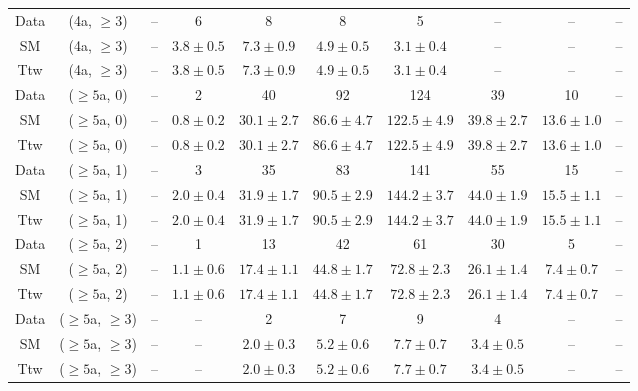 \begin{table}[h!]
{\begin{tabular}{cccccccccc}
	Data & (4a, $\ge3$) & -- & 6 & 8 & 8 & 5 & -- & -- & -- \\[0.5ex] 
	SM & (4a, $\ge3$) & -- & $3.8\pm 0.5$ & $7.3\pm 0.9$ & $4.9\pm 0.5$ & $3.1\pm 0.4$ & -- & -- & -- \\[0.5ex] 
	Ttw & (4a, $\ge3$) & -- & $3.8\pm 0.5$ & $7.3\pm 0.9$ & $4.9\pm 0.5$ & $3.1\pm 0.4$ & -- & -- & -- \\[0.5ex] 
	Data & ($\ge5$a, 0) & -- & 2 & 40 & 92 & 124 & 39 & 10 & -- \\[0.5ex] 
	SM & ($\ge5$a, 0) & -- & $0.8\pm 0.2$ & $30.1\pm 2.7$ & $86.6\pm 4.7$ & $122.5\pm 4.9$ & $39.8\pm 2.7$ & $13.6\pm 1.0$ & -- \\[0.5ex] 
	Ttw & ($\ge5$a, 0) & -- & $0.8\pm 0.2$ & $30.1\pm 2.7$ & $86.6\pm 4.7$ & $122.5\pm 4.9$ & $39.8\pm 2.7$ & $13.6\pm 1.0$ & -- \\[0.5ex] 
	Data & ($\ge5$a, 1) & -- & 3 & 35 & 83 & 141 & 55 & 15 & -- \\[0.5ex] 
	SM & ($\ge5$a, 1) & -- & $2.0\pm 0.4$ & $31.9\pm 1.7$ & $90.5\pm 2.9$ & $144.2\pm 3.7$ & $44.0\pm 1.9$ & $15.5\pm 1.1$ & -- \\[0.5ex] 
	Ttw & ($\ge5$a, 1) & -- & $2.0\pm 0.4$ & $31.9\pm 1.7$ & $90.5\pm 2.9$ & $144.2\pm 3.7$ & $44.0\pm 1.9$ & $15.5\pm 1.1$ & -- \\[0.5ex] 
	Data & ($\ge5$a, 2) & -- & 1 & 13 & 42 & 61 & 30 & 5 & -- \\[0.5ex] 
	SM & ($\ge5$a, 2) & -- & $1.1\pm 0.6$ & $17.4\pm 1.1$ & $44.8\pm 1.7$ & $72.8\pm 2.3$ & $26.1\pm 1.4$ & $7.4\pm 0.7$ & -- \\[0.5ex] 
	Ttw & ($\ge5$a, 2) & -- & $1.1\pm 0.6$ & $17.4\pm 1.1$ & $44.8\pm 1.7$ & $72.8\pm 2.3$ & $26.1\pm 1.4$ & $7.4\pm 0.7$ & -- \\[0.5ex] 
	Data & ($\ge5$a, $\ge3$) & -- & -- & 2 & 7 & 9 & 4 & -- & -- \\[0.5ex] 
	SM & ($\ge5$a, $\ge3$) & -- & -- & $2.0\pm 0.3$ & $5.2\pm 0.6$ & $7.7\pm 0.7$ & $3.4\pm 0.5$ & -- & -- \\[0.5ex] 
	Ttw & ($\ge5$a, $\ge3$) & -- & -- & $2.0\pm 0.3$ & $5.2\pm 0.6$ & $7.7\pm 0.7$ & $3.4\pm 0.5$ & -- & -- \\[0.5ex] 
	\hline
	\hline
\end{tabular}}
\end{table}
